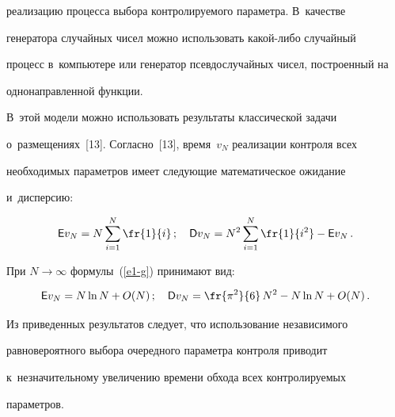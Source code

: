 реализацию процесса выбора контролируемого параметра. В~качестве 


генератора случайных чисел можно использовать ка\-кой-ли\-бо случайный 


процесс в~компьютере или генератор псевдослучайных чисел, построенный на 


однонаправленной функции. 


{





}


  


  В~этой модели можно использовать результаты классической задачи 


о~размещениях~[13]. Согласно~[13], время~$v_N$ реализации контроля всех 


необходимых параметров имеет следующие математическое ожидание 


и~дисперсию: 


  \begin{equation}


  {\sf E} v_N = N\sum\limits_{i=1}^N \fr{1}{i}\,;\quad {\sf D}v_N= 


N^2\sum\limits_{i=1}^N \fr{1}{i^2}-{\sf E}v_N\,.


  \label{e1-g}


  \end{equation}


  


  При $N\to\infty$ формулы~(\ref{e1-g}) принимают вид:


  \begin{equation}


  {\sf E}v_N= N\ln N +O(N)\,;\quad {\sf D}v_N=\fr{\pi^2}{6}\,N^2 -N\ln N+O(N)\,.


  \label{e2-g}


  \end{equation}


  


  Из приведенных результатов следует, что использование независимого 


равновероятного выбора очередного параметра контроля приводит 


к~незначительному увеличению времени обхода всех контролируемых 


параметров. 


  


